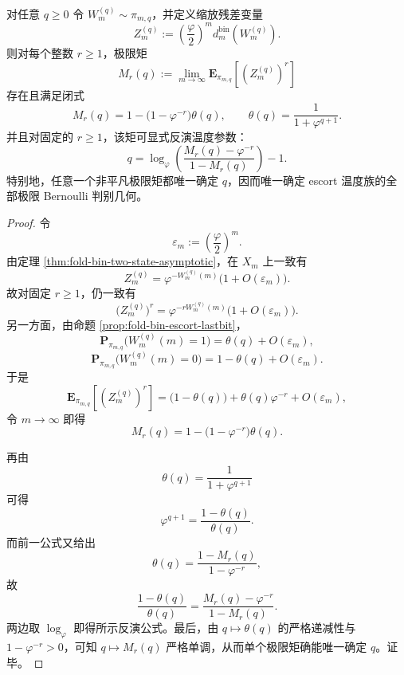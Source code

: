\begin{theorem}\label{thm:xi-time-part9o-escort-residual-moment-identifiability}
对任意 \(q\ge 0\) 令 \(W_m^{(q)}\sim \pi_{m,q}\)，并定义缩放残差变量
\[
Z_m^{(q)}:=\left(\frac{\varphi}{2}\right)^m d_m^{\mathrm{bin}}(W_m^{(q)}).
\]
则对每个整数 \(r\ge 1\)，极限矩
\[
M_r(q):=\lim_{m\to\infty}\mathbf E_{\pi_{m,q}}\!\left[(Z_m^{(q)})^r\right]
\]
存在且满足闭式
\[
\boxed{\;
M_r(q)=1-\bigl(1-\varphi^{-r}\bigr)\theta(q),
\qquad
\theta(q)=\frac{1}{1+\varphi^{q+1}}.\;}
\]
并且对固定的 \(r\ge 1\)，该矩可显式反演温度参数：
\[
\boxed{\;
q=\log_\varphi\!\left(\frac{M_r(q)-\varphi^{-r}}{1-M_r(q)}\right)-1.\;}
\]
特别地，任意一个非平凡极限矩都唯一确定 \(q\)，因而唯一确定 escort 温度族的全部极限 Bernoulli 判别几何。
\end{theorem}
\begin{proof}
令
\[
\varepsilon_m:=\left(\frac{\varphi}{2}\right)^m.
\]
由定理 \ref{thm:fold-bin-two-state-asymptotic}，在 \(X_m\) 上一致有
\[
Z_m^{(q)}=\varphi^{-W_m^{(q)}(m)}\bigl(1+O(\varepsilon_m)\bigr).
\]
故对固定 \(r\ge 1\)，仍一致有
\[
\bigl(Z_m^{(q)}\bigr)^r
=
\varphi^{-rW_m^{(q)}(m)}\bigl(1+O(\varepsilon_m)\bigr).
\]
另一方面，由命题 \ref{prop:fold-bin-escort-lastbit}，
\[
\mathbf P_{\pi_{m,q}}\bigl(W_m^{(q)}(m)=1\bigr)=\theta(q)+O(\varepsilon_m),
\]
\[
\mathbf P_{\pi_{m,q}}\bigl(W_m^{(q)}(m)=0\bigr)=1-\theta(q)+O(\varepsilon_m).
\]
于是
\[
\mathbf E_{\pi_{m,q}}\!\left[(Z_m^{(q)})^r\right]
=
\bigl(1-\theta(q)\bigr)+\theta(q)\varphi^{-r}+O(\varepsilon_m),
\]
令 \(m\to\infty\) 即得
\[
M_r(q)=1-\bigl(1-\varphi^{-r}\bigr)\theta(q).
\]

再由
\[
\theta(q)=\frac{1}{1+\varphi^{q+1}}
\]
可得
\[
\varphi^{q+1}=\frac{1-\theta(q)}{\theta(q)}.
\]
而前一公式又给出
\[
\theta(q)=\frac{1-M_r(q)}{1-\varphi^{-r}},
\]
故
\[
\frac{1-\theta(q)}{\theta(q)}
=
\frac{M_r(q)-\varphi^{-r}}{1-M_r(q)}.
\]
两边取 \(\log_\varphi\) 即得所示反演公式。最后，由 \(q\mapsto \theta(q)\) 的严格递减性与 \(1-\varphi^{-r}>0\)，可知 \(q\mapsto M_r(q)\) 严格单调，从而单个极限矩确能唯一确定 \(q\)。证毕。
\end{proof}





